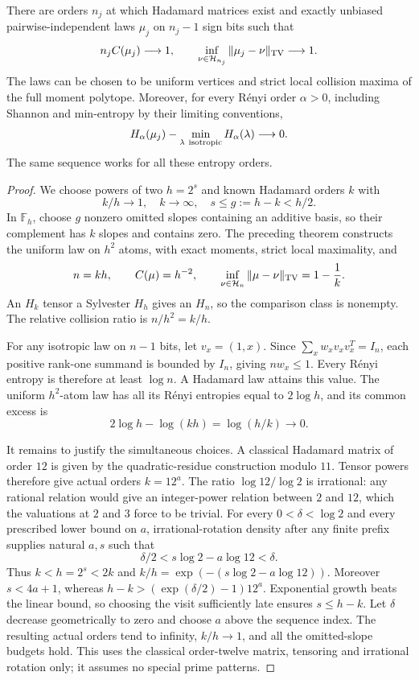 \begin{theorem}
\label{s25:thm:relative-no-stability}
There are orders $n_j$ at which Hadamard matrices exist and exactly
unbiased pairwise-independent laws $\mu_j$ on $n_j-1$ sign bits such that
\[
 n_j C(\mu_j)\longrightarrow1,\qquad
 \inf_{\nu\in\mathcal H_{n_j}}\|\mu_j-\nu\|_{\rm TV}
 \longrightarrow1.
\]
The laws can be chosen to be uniform vertices and strict local
collision maxima of the full moment polytope. Moreover, for every
R\'enyi order $\alpha>0$, including Shannon and min-entropy by their
limiting conventions,
\[
 H_\alpha(\mu_j)-\min_{\lambda\ {\rm isotropic}}H_\alpha(\lambda)
 \longrightarrow0.
\]
The same sequence works for all these entropy orders.
\end{theorem}
\begin{proof}
We choose powers of two $h=2^s$ and known Hadamard orders $k$ with
\[
 k/h\to1,\quad k\to\infty,\quad
 s\le g:=h-k<h/2.
\]
In $\mathbb F_h$, choose $g$ nonzero omitted slopes containing an
additive basis, so their complement has $k$ slopes and contains zero.
The preceding theorem constructs the uniform law on $h^2$ atoms,
with exact moments, strict local maximality, and
\[
 n=kh,\qquad C(\mu)=h^{-2},\qquad
 \inf_{\nu\in\mathcal H_n}\|\mu-\nu\|_{\rm TV}=1-\frac1k.
\]
An $H_k$ tensor a Sylvester $H_h$ gives an $H_n$, so the comparison
class is nonempty. The relative collision ratio is $n/h^2=k/h$.

For any isotropic law on $n-1$ bits, let $v_x=(1,x)$.
Since $\sum_xw_xv_xv_x^T=I_n$, each positive rank-one summand
is bounded by $I_n$, giving $nw_x\le1$.
Every R\'enyi entropy is therefore at least $\log n$.
A Hadamard law attains this value. The uniform $h^2$-atom law has
all its R\'enyi entropies equal to $2\log h$, and its common excess is
\[
                  2\log h-\log(kh)=\log(h/k)\to0.
\]

It remains to justify the simultaneous choices. A classical Hadamard
matrix of order $12$ is given by the quadratic-residue construction
modulo $11$. Tensor powers therefore give actual orders $k=12^a$.
The ratio $\log12/\log2$ is irrational: any rational relation
would give an integer-power relation between $2$ and $12$, which
the valuations at $2$ and $3$ force to be trivial.
For every $0<\delta<\log2$ and every prescribed lower bound on $a$,
irrational-rotation density after any finite prefix supplies natural
$a,s$ such that
\[
 \delta/2<s\log2-a\log12<\delta.
\]
Thus $k<h=2^s<2k$ and $k/h=\exp(-(s\log2-a\log12))$.
Moreover $s<4a+1$, whereas
$h-k>(\exp(\delta/2)-1)12^a$. Exponential growth beats the linear
bound, so choosing the visit sufficiently late ensures $s\le h-k$.
Let $\delta$ decrease geometrically to zero and choose $a$ above the
sequence index. The resulting actual orders tend to infinity,
$k/h\to1$, and all the omitted-slope budgets hold.
This uses the classical order-twelve matrix, tensoring and irrational
rotation only; it assumes no special prime patterns.
\end{proof}

